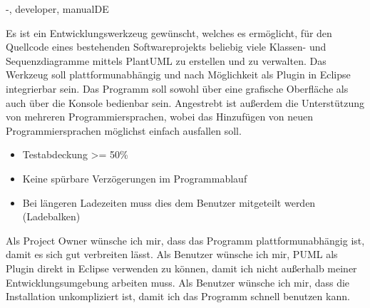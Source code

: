 \documentclass[twoside]{report}
\begin{document}
\begin{shownto}{-, developer, manualDE}

Es ist ein Entwicklungswerkzeug gewünscht, welches es ermöglicht, für den Quellcode eines bestehenden Softwareprojekts beliebig viele Klassen- und Sequenzdiagramme mittels PlantUML zu erstellen und zu verwalten. Das Werkzeug soll plattformunabhängig und nach Möglichkeit als Plugin in Eclipse integrierbar sein. Das Programm soll sowohl über eine grafische Oberfläche als auch über die Konsole bedienbar sein. Angestrebt ist außerdem die Unterstützung von mehreren Programmiersprachen, wobei das Hinzufügen von neuen Programmiersprachen möglichst einfach ausfallen soll.
\nsecend





\nsecend

%
%
% 

\begin{itemize}
\nsecend %
\item Testabdeckung >= 50\%
\item Keine spürbare Verzögerungen im Programmablauf
\item Bei längeren Ladezeiten muss dies dem Benutzer mitgeteilt werden (Ladebalken)
\end{itemize} 

Als Project Owner wünsche ich mir, dass das Programm plattformunabhängig ist, damit es sich gut verbreiten lässt.
\nsecend
{}
Als Benutzer wünsche ich mir, PUML als Plugin direkt in Eclipse verwenden zu können, damit ich nicht außerhalb meiner Entwicklungsumgebung arbeiten muss.
\nsecend
{}
Als Benutzer wünsche ich mir, dass die Installation unkompliziert ist, damit ich das Programm schnell benutzen kann.
\nsecend
\nsecend %
\nsecend %


\end{shownto}
\end{document}
